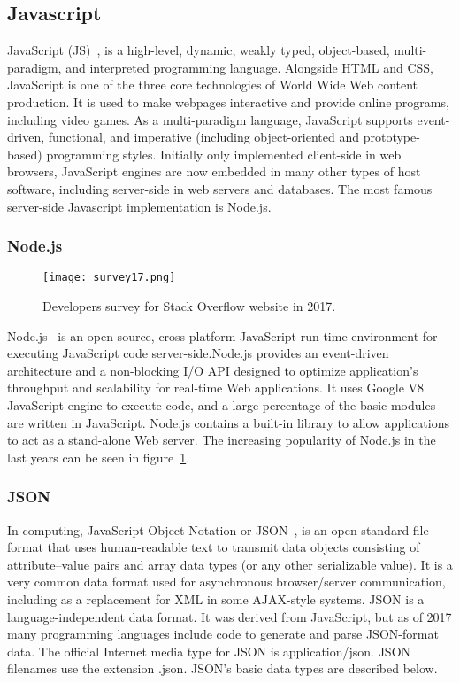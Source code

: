 \subsection{Javascript}
JavaScript (JS)~\cite{crockford2008javascript}, is a high-level, dynamic, weakly typed, object-based, multi-paradigm, and interpreted programming language. Alongside HTML and CSS, JavaScript is one of the three core technologies of World Wide Web content production. It is used to make webpages interactive and provide online programs, including video games. As a multi-paradigm language, JavaScript supports event-driven, functional, and imperative (including object-oriented and prototype-based) programming styles. Initially only implemented client-side in web browsers, JavaScript engines are now embedded in many other types of host software, including server-side in web servers and databases. The most famous server-side Javascript implementation is Node.js.

\subsubsection{Node.js}
\begin{figure}
	\centerline{\texttt{[image: survey17.png]}}
	\caption{Developers survey for Stack Overflow website in 2017.}
	\label{survey17}
\end{figure}
Node.js~\cite{tilkov2010node} is an open-source, cross-platform JavaScript run-time environment for executing JavaScript code server-side.Node.js provides an event-driven architecture and a non-blocking I/O API designed to optimize application's throughput and scalability for real-time Web applications. It uses Google V8 JavaScript engine to execute code, and a large percentage of the basic modules are written in JavaScript. Node.js contains a built-in library to allow applications to act as a stand-alone Web server. The increasing popularity of Node.js in the last years can be seen in figure~\ref{survey17}.

\subsubsection{JSON}
\label{json}
In computing, JavaScript Object Notation or JSON~\cite{crockford2006application}, is an open-standard file format that uses human-readable text to transmit data objects consisting of attribute–value pairs and array data types (or any other serializable value). It is a very common data format used for asynchronous browser/server communication, including as a replacement for XML in some AJAX-style systems.
JSON is a language-independent data format. It was derived from JavaScript, but as of 2017 many programming languages include code to generate and parse JSON-format data. The official Internet media type for JSON is application/json. JSON filenames use the extension .json. JSON's basic data types are described below. \par
